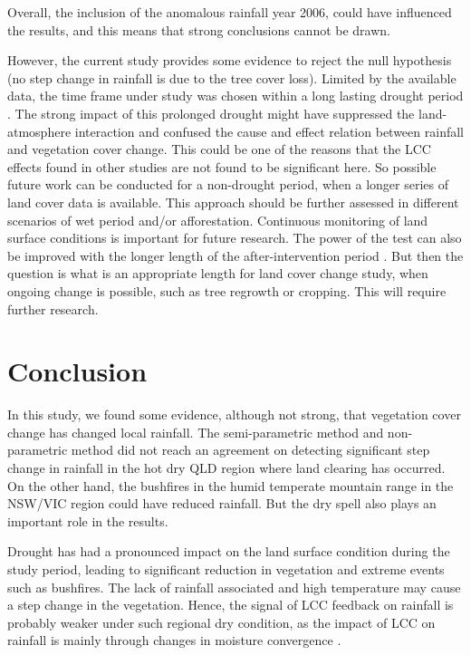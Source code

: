 \documentclass[draft,linenumbers]{agujournal}
\begin{document}
Overall, the inclusion of the anomalous rainfall year 2006, could have influenced the results, and this means that strong conclusions cannot be drawn.

However, the current study provides some evidence to reject the null hypothesis (no step change in rainfall is due to the tree cover loss). Limited by the available data, the time frame under study was chosen within a long lasting drought period \citep{Holper2011}. The strong impact of this prolonged drought might have suppressed the land-atmosphere interaction and confused the cause and effect relation between rainfall and vegetation cover change. This could be one of the reasons that the LCC effects found in other studies \citep[e.g.]{Gorgen2006,McAlpine2007} are not found to be significant here. So possible future work can be conducted for a non-drought period, when a longer series of land cover data is available. This approach should be further assessed in different scenarios of wet period and/or afforestation. Continuous monitoring of land surface conditions is important for future research. The power of the test can also be improved with the longer length of the after-intervention period \citep{Hirsch1985}. But then the question is what is an appropriate length for land cover change study, when ongoing change is possible, such as tree regrowth or cropping. This will require further research.

\section{Conclusion}

In this study, we found some evidence, although not strong, that vegetation cover change has changed local rainfall. The semi-parametric method and non-parametric method did not reach an agreement on detecting significant step change in rainfall in the hot dry QLD region where land clearing has occurred. On the other hand, the bushfires in the humid temperate mountain range in the NSW/VIC region could have reduced rainfall. But the dry spell also plays an important role in the results. 

Drought has had a pronounced impact on the land surface condition during the study period, leading to significant reduction in vegetation and extreme events such as bushfires. The lack of rainfall associated and high temperature may cause a step change in the vegetation. Hence, the signal of LCC feedback on rainfall is probably weaker under such regional dry condition, as the impact of LCC on rainfall is mainly through changes in moisture convergence \citep{Gorgen2006,Pitman2007}.
\end{document}
